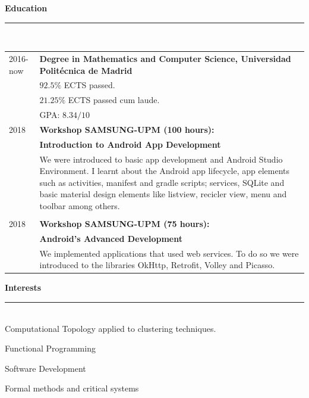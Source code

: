 \documentclass{article}
\begin{document}
\begin{minipage}[t]{0.66\linewidth}
  \textbf{\Large{\color{BlueViolet}Education}}\\[-0.25cm]
  {\color{BlueViolet} \rule{\linewidth}{0.1mm} }\\[-0.25cm]
  \begin{tabular}{l l}
    \multicolumn{1}{p{0.6cm}}{2016-now}& \multicolumn{1}{p{8.4cm}}{\textbf{Degree in Mathematics and Computer Science, Universidad Politécnica de Madrid} }\\
         & \normalsize \quad $92.5\%$ ECTS passed.\\
            & \normalsize \quad $21.25\%$ ECTS passed cum laude.\\
         & \normalsize \quad GPA: $8.34/10$ \\[0.3cm]
    2018 & \textbf{Workshop SAMSUNG-UPM (100 hours):} \\ & \textbf{Introduction to Android App Development} \\
         & \multicolumn{1}{p{11cm}}{\normalsize We were introduced to basic app development and Android Studio Environment. I learnt about the Android app lifecycle, app elements such as activities, manifest and gradle scripts; services, SQLite and basic material design elements like listview, recicler view, menu and toolbar among others.} \\ \\[-0.12cm]
    2018 & \textbf{Workshop SAMSUNG-UPM (75 hours):} \\ & \textbf{Android's Advanced Development} \\
         & \multicolumn{1}{p{11cm}}{\normalsize We implemented applications that used web services. To do so we were introduced to the libraries OkHttp, Retrofit, Volley and Picasso.} \\
  \end{tabular}
  \vspace{0.3cm}
  
  \textbf{\Large{\color{BlueViolet}Interests}}\\[-0.25cm]
  {\color{BlueViolet} \rule{\linewidth}{0.1mm} }\\[-0.25cm]
  Computational Topology applied to clustering techniques.

  Functional Programming

  Software Development

  Formal methods and critical systems

  
\end{minipage}
\end{document}
